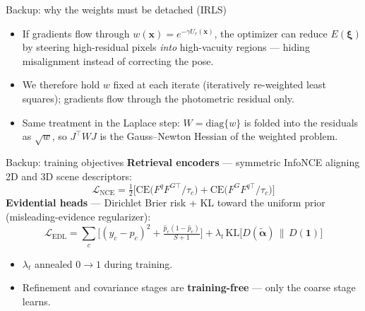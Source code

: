 \documentclass[aspectratio=169,10pt]{beamer}
\begin{document}
\begin{frame}{Backup: why the weights must be detached (IRLS)}
  \begin{itemize}
    \item If gradients flow through $w(\mathbf{x}) = e^{-\gamma U_r(\mathbf{x})}$,
          the optimizer can reduce $E(\bm\xi)$ by steering high-residual
          pixels \emph{into} high-vacuity regions --- hiding misalignment
          instead of correcting the pose.
    \item We therefore hold $w$ fixed at each iterate (iteratively
          re-weighted least squares); gradients flow through the
          photometric residual only.
    \item Same treatment in the Laplace step: $W = \mathrm{diag}\{w\}$ is
          folded into the residuals as $\sqrt{w}$, so
          $J^\top W J$ is the Gauss--Newton Hessian of the weighted problem.
  \end{itemize}
\end{frame}

\begin{frame}{Backup: training objectives}
  \textbf{Retrieval encoders} --- symmetric InfoNCE aligning 2D and 3D scene
  descriptors:
  \begin{equation*}
    \mathcal{L}_{\mathrm{NCE}} = \tfrac{1}{2}\big[
    \mathrm{CE}\big(F^q F^{G\top}/\tau_c\big) +
    \mathrm{CE}\big(F^G F^{q\top}/\tau_c\big)\big]
  \end{equation*}
  \textbf{Evidential heads} --- Dirichlet Brier risk + KL toward the uniform
  prior (misleading-evidence regularizer):
  \begin{equation*}
    \mathcal{L}_{\mathrm{EDL}} = \sum_c \Big[(y_c - \hat{p}_c)^2 +
    \tfrac{\hat{p}_c (1 - \hat{p}_c)}{S + 1}\Big]
    + \lambda_t\, \mathrm{KL}\big[D(\tilde{\bm\alpha}) \,\|\, D(\mathbf{1})\big]
  \end{equation*}
  \begin{itemize}
    \item $\lambda_t$ annealed $0 \to 1$ during training.
    \item Refinement and covariance stages are \textbf{training-free} ---
          only the coarse stage learns.
  \end{itemize}
\end{frame}
\end{document}
